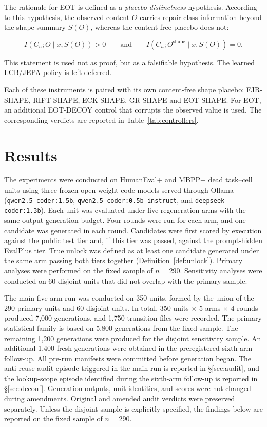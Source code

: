 \documentclass{article}
\numberwithin{equation}{section}  %
\theoremstyle{definition}
\newcommand{\armGR}{\textsf{GR-SHAPE}}
\begin{document}
The rationale for EOT is defined as a \emph{placebo-distinctness} hypothesis. According to
this hypothesis, the observed content $O$ carries repair-class information beyond the shape
summary $S(O)$, whereas the content-free placebo does not:

\[
I(C_u;O\mid x,S(O))>0
\qquad\text{and}\qquad
I(C_u;O^{\mathrm{shape}}\mid x,S(O))=0.
\]

This statement is used not as proof, but as a falsifiable hypothesis. The learned LCB/JEPA
policy is left deferred.

Each of these instruments is paired with its own content-free shape placebo:
\mbox{FJR-SHAPE,} RIFT-SHAPE, ECK-SHAPE, \armGR{} and EOT-SHAPE. For EOT, an additional
EOT-DECOY control that corrupts the observed value is used. The corresponding verdicts are
reported in Table~\ref{tab:controllers}.

\section{Results}
\label{sec:results}

The experiments were conducted on HumanEval+ and MBPP+ dead task--cell units using three
frozen open-weight code models served through Ollama
(\texttt{qwen2.5-coder:1.5b}, \texttt{qwen2.5-coder:0.5b-instruct}, and
\texttt{deepseek-coder:1.3b}). Each unit was evaluated under five regeneration arms with the
same output-generation budget. Four rounds were run for each arm, and one candidate was
generated in each round. Candidates were first scored by execution against the public test
tier and, if this tier was passed, against the prompt-hidden EvalPlus tier. True unlock was
defined as at least one candidate generated under the same arm passing both tiers together
(Definition~\ref{def:unlock}). Primary analyses were performed on the fixed sample of
$n=290$. Sensitivity analyses were conducted on 60 disjoint units that did not overlap with
the primary sample.

The main five-arm run was conducted on 350 units, formed by the union of the 290 primary units
and 60 disjoint units. In total, 350 units $\times$ 5 arms $\times$ 4 rounds produced
7{,}000 generations, and 1{,}750 transition files were recorded. The primary statistical
family is based on 5{,}800 generations from the fixed sample. The remaining 1{,}200
generations were produced for the disjoint sensitivity sample. An additional 1{,}400 fresh
generations were obtained in the preregistered sixth-arm follow-up. All pre-run manifests were
committed before generation began. The anti-reuse audit episode triggered in the main run is
reported in \S\ref{sec:audit}, and the lookup-scope episode identified during the sixth-arm
follow-up is reported in \S\ref{sec:deconf}. Generation outputs, unit identities, and scores
were not changed during amendments. Original and amended audit verdicts were preserved
separately. Unless the disjoint sample is explicitly specified, the findings below are reported
on the fixed sample of $n=290$.
\end{document}
